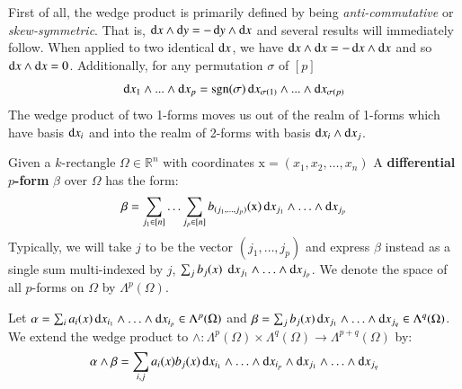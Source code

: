 First of all, the wedge product is primarily defined by being \emph{anti-commutative} or \emph{skew-symmetric}.
That is, $\mathop{}\!\mathrm{d} x \wedge \mathop{}\!\mathrm{d} y = -\mathop{}\!\mathrm{d} y \wedge \mathop{}\!\mathrm{d} x$ and several results will immediately follow.
When applied to two identical $\mathop{}\!\mathrm{d} x$, we have $\mathop{}\!\mathrm{d} x \wedge \mathop{}\!\mathrm{d} x = - \mathop{}\!\mathrm{d} x \wedge \mathop{}\!\mathrm{d} x$ 
and so $\mathop{}\!\mathrm{d} x \wedge \mathop{}\!\mathrm{d} x = 0$.
Additionally, for any permutation $\sigma$ of $[p]$
\begin{equation*}
	\mathop{}\!\mathrm{d} x_1 \wedge ... \wedge \mathop{}\!\mathrm{d} x_p 
	= \text{sgn}(\sigma) \mathop{}\!\mathrm{d} x_{\sigma(1)} \wedge ... \wedge \mathop{}\!\mathrm{d} x_{\sigma(p)}
\end{equation*}
The wedge product of two 1-forms moves us out of the realm of 1-forms which have basis $\mathop{}\!\mathrm{d} x_i$ and into the 
realm of 2-forms with basis $\mathop{}\!\mathrm{d} x_i \wedge \mathop{}\!\mathrm{d} x_j$.


\begin{definition}
	Given a $k$-rectangle $\Omega \in \mathbb{R}^n$ with coordinates $\text{x} = (x_1, x_2, \ldots, x_n)$
	A \textbf{differential $p$-form} $\beta$ over $\Omega$ has the form:
	\begin{equation}
		\beta = \sum_{j_1 \in [n]} \ldots \sum_{j_p \in [n]} b_{(j_1, \ldots, j_p)}(\text{x})
				\mathop{}\!\mathrm{d} x_{j_1} \wedge \ldots \wedge \mathop{}\!\mathrm{d} x_{j_p}
	\end{equation}
	Typically, we will take $j$ to be the vector $(j_1, \ldots, j_p)$ 
	and express $\beta$ instead as a single sum multi-indexed
	by $j$, $\sum_j b_j(x) \; \mathop{}\!\mathrm{d} x_{j_1} \wedge \ldots \wedge \mathop{}\!\mathrm{d} x_{j_p}$.
	We denote the space of all $p$-forms on $\Omega$ by $\Lambda^p(\Omega)$.
\end{definition}


\begin{definition}
	Let $\alpha = \sum_i a_i(x) \mathop{}\!\mathrm{d} x_{i_1} \wedge \ldots \wedge \mathop{}\!\mathrm{d} x_{i_p} \in \Lambda^p(\Omega)$ 
	and $\beta = \sum_j b_j(x) \mathop{}\!\mathrm{d} x_{j_1} \wedge \ldots \wedge \mathop{}\!\mathrm{d} x_{j_q} \in \Lambda^q(\Omega)$. 
	We extend the wedge product to 
	$\wedge : \Lambda^p(\Omega) \times \Lambda^q(\Omega) \to \Lambda^{p+q}(\Omega)$ by:
	\begin{equation}
		\alpha \wedge \beta  = \sum_{i,j} a_i(x) b_j(x)
			\mathop{}\!\mathrm{d} x_{i_1} \wedge \ldots \wedge \mathop{}\!\mathrm{d} x_{i_p} \wedge 
			\mathop{}\!\mathrm{d} x_{j_1} \wedge \ldots \wedge \mathop{}\!\mathrm{d} x_{j_q}
	\end{equation}
\end{definition}

